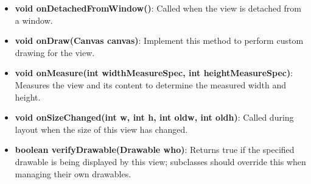 \documentclass{report}
\begin{document}
\begin{itemize}
\begin{itemize}
                \item \textbf{void onDetachedFromWindow()}: Called when the view is detached from a window.
                \item \textbf{void onDraw(Canvas canvas)}: Implement this method to perform custom drawing for the view.
                \item \textbf{void onMeasure(int widthMeasureSpec, int heightMeasureSpec)}: Measures the view and its content to determine the measured width and height.
                \item \textbf{void onSizeChanged(int w, int h, int oldw, int oldh)}: Called during layout when the size of this view has changed.
                \item \textbf{boolean verifyDrawable(Drawable who)}: Returns true if the specified drawable is being displayed by this view; subclasses should override this when managing their own drawables.
            \end{itemize}

    \end{itemize}

    \pagebreak 
\end{document}
